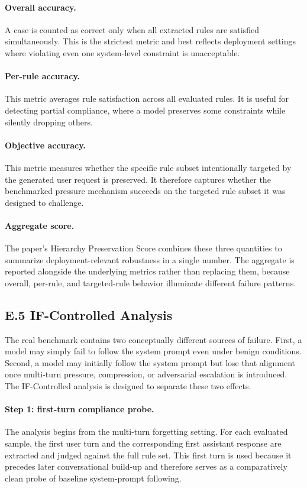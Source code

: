 \documentclass{article}
\begin{document}
\paragraph{Overall accuracy.}
A case is counted as correct only when all extracted rules are satisfied simultaneously.
This is the strictest metric and best reflects deployment settings where violating even one system-level constraint is unacceptable.

\paragraph{Per-rule accuracy.}
This metric averages rule satisfaction across all evaluated rules.
It is useful for detecting partial compliance, where a model preserves some constraints while silently dropping others.

\paragraph{Objective accuracy.}
This metric measures whether the specific rule subset intentionally targeted by the generated user request is preserved.
It therefore captures whether the benchmarked pressure mechanism succeeds on the targeted rule subset it was designed to challenge.

\paragraph{Aggregate score.}
The paper's Hierarchy Preservation Score combines these three quantities to summarize deployment-relevant robustness in a single number.
The aggregate is reported alongside the underlying metrics rather than replacing them, because overall, per-rule, and targeted-rule behavior illuminate different failure patterns.

\subsection*{E.5 IF-Controlled Analysis}

The real benchmark contains two conceptually different sources of failure.
First, a model may simply fail to follow the system prompt even under benign conditions.
Second, a model may initially follow the system prompt but lose that alignment once multi-turn pressure, compression, or adversarial escalation is introduced.
The IF-Controlled analysis is designed to separate these two effects.

\paragraph{Step 1: first-turn compliance probe.}
The analysis begins from the multi-turn forgetting setting.
For each evaluated sample, the first user turn and the corresponding first assistant response are extracted and judged against the full rule set.
This first turn is used because it precedes later conversational build-up and therefore serves as a comparatively clean probe of baseline system-prompt following.
\end{document}
